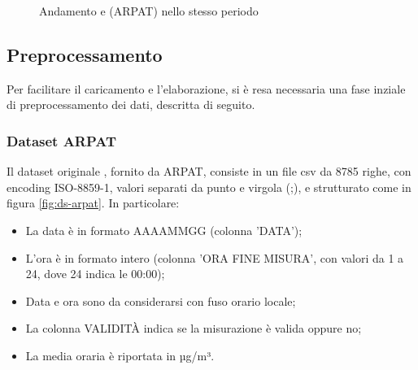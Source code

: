 \begin{figure}[H]%
    \centering
    \captionsetup{justification=centering}
    \caption{Andamento  e  (ARPAT) nello stesso periodo}%
    \label{fig:arpat-pm}%
\end{figure}

\subsection{Preprocessamento}\label{ssec:preprocessamento}
Per facilitare il caricamento e l'elaborazione, si è resa necessaria una fase inziale di preprocessamento dei dati, descritta di seguito.

\subsubsection{Dataset ARPAT }
Il dataset originale , fornito da ARPAT, consiste in un file csv da 8785 righe, con encoding ISO-8859-1, valori separati da punto e virgola (;), e strutturato come in figura \ref{fig:ds-arpat}. In particolare:
\begin{itemize}
  \item La data è in formato AAAAMMGG (colonna 'DATA');
  \item L'ora è in formato intero (colonna 'ORA FINE MISURA', con valori da 1 a 24, dove 24 indica le 00:00);
  \item Data e ora sono da considerarsi con fuso orario locale;
  \item La colonna VALIDITÀ indica se la misurazione è valida oppure no;
  \item La media oraria è riportata in µg/m³.
\end{itemize}

